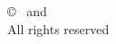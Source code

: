 \thispagestyle{empty}
\begin{center}
\vspace*{\fill}
{\copyright~ \textit{\firstAuthor} and \textit{\secondAuthor}}\\
All rights reserved
\vspace*{\fill} 
\end{center}